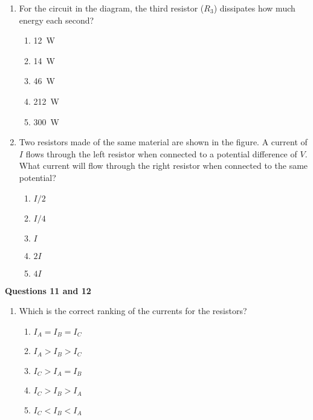 \documentclass{../../oss-apphys}
\begin{document}
\begin{multicols}{2}
\begin{enumerate}[leftmargin=18pt,resume]
  \item For the circuit in the diagram, the third resistor ($R_3$) dissipates
    how much energy each second?
    \begin{enumerate}[noitemsep,topsep=0pt,leftmargin=18pt,label=(\Alph*)]
    \item\SI{12}{W}
    \item\SI{14}{W}
    \item\SI{46}{W}
    \item\SI{212}{W}
    \item\SI{300}{W}
    \end{enumerate}

    \columnbreak
    
  \item Two resistors made of the same material are shown in the figure. A
    current of $I$ flows through the left resistor when connected to a
    potential difference of $V$. What current will flow through the right
    resistor when connected to the same potential?

    \vspace{-.2in}
    \begin{center}
    \end{center}
    \begin{enumerate}[noitemsep,topsep=0pt,leftmargin=18pt,label=(\Alph*)]
    \item $I/2$
    \item $I/4$
    \item $I$
    \item $2I$
    \item $4I$
    \end{enumerate}
  \end{enumerate}

  \textbf{Questions 11 and 12}
  
  \begin{center}
  \end{center}
  
  \begin{enumerate}[leftmargin=18pt,resume]
  \item Which is the correct ranking of the currents for the resistors?
    \begin{enumerate}[noitemsep,topsep=0pt,leftmargin=18pt,label=(\Alph*)]
    \item$I_A = I_B = I_C$
    \item$I_A > I_B > I_C$
    \item$I_C > I_A = I_B$
    \item$I_C > I_B > I_A$
    \item$I_C < I_B < I_A$
    \end{enumerate}


\end{enumerate}
\end{multicols}
\end{document}
